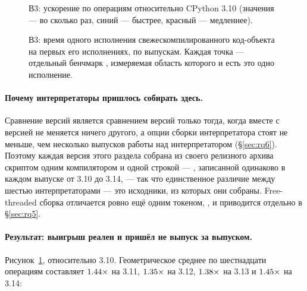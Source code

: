 \begin{figure}[t]
  \centering
  \caption{В3: ускорение по операциям относительно CPython 3.10 (значения --- во сколько раз,
    синий --- быстрее, красный --- медленнее).}
  \label{fig:versions}
\end{figure}

\begin{table}[t]
  \centering
  \caption{В3: структурные свойства рантайма, измеренные тем же набором.}
  \label{tab:facts}
  \small
  
\end{table}

\begin{figure}[t]
  \centering
  \caption{В3: время одного исполнения свежескомпилированного код-объекта на первых его
    исполнениях, по выпускам. Каждая точка --- отдельный бенчмарк , измеряемая
    область которого и есть это одно исполнение.}
  \label{fig:warmup}
\end{figure}

\paragraph{Почему интерпретаторы пришлось собирать здесь.} Сравнение версий является сравнением
версий только тогда, когда вместе с версией не меняется ничего другого, а опции сборки
интерпретатора стоят не меньше, чем несколько выпусков работы над интерпретатором
(\S\ref{sec:rq6}). Поэтому каждая версия этого раздела собрана из своего релизного архива скриптом
 одним компилятором и одной строкой  ---
, записанной одинаково в каждом выпуске от 3.10 до 3.14, --- так что
единственное различие между шестью интерпретаторами --- это исходники, из которых они собраны.
Free-threaded сборка отличается ровно ещё одним токеном, , и приводится
отдельно в \S\ref{sec:rq5}.

\paragraph{Результат: выигрыш реален и пришёл не выпуск за выпуском.}
Рисунок~\ref{fig:versions}, относительно 3.10. Геометрическое среднее по
шестнадцати операциям составляет $\meas{geomean:b3_runtime-v310|b3_runtime-v311}{1.44}\times$ на 3.11, $\meas{geomean:b3_runtime-v310|b3_runtime-v312}{1.35}\times$ на 3.12, $\meas{geomean:b3_runtime-v310|b3_runtime-v313}{1.38}\times$ на 3.13 и
$\meas{geomean:b3_runtime-v310|b3_runtime-v314}{1.45}\times$ на 3.14:

